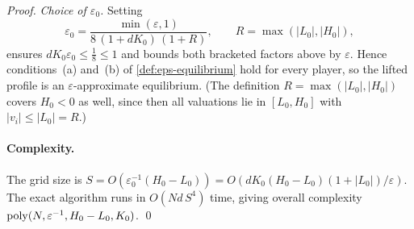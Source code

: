 \begin{proof}
\emph{Choice of $\varepsilon_0$.} Setting
\begin{equation}
\label{eq:prf:fptas:eps0}
\varepsilon_0 = \frac{\min(\varepsilon,1)}{8\,(1 + d K_0)\,(1 + R)}, \qquad R = \max(|L_0|, |H_0|),
\end{equation}
ensures $d K_0 \varepsilon_0 \le \tfrac18 \le 1$ and bounds both bracketed factors above by $\varepsilon$. Hence conditions~(a) and~(b) of \cref{def:eps-equilibrium} hold for every player, so the lifted profile is an $\varepsilon$-approximate equilibrium. (The definition $R = \max(|L_0|,|H_0|)$ covers $H_0 < 0$ as well, since then all valuations lie in $[L_0, H_0]$ with $|v_i| \le |L_0| = R$.)

\paragraph{Complexity.}
The grid size is $S = O(\varepsilon_0^{-1}(H_0 - L_0)) = O(dK_0(H_0-L_0)(1+|L_0|)/\varepsilon)$. The exact algorithm runs in $O(N d\, S^4)$ time, giving overall complexity $\mathrm{poly}(N, \varepsilon^{-1}, H_0-L_0, K_0)$.
\qed
\end{proof}
